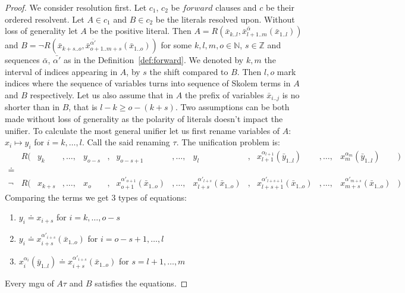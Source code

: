 \documentclass[english, shortabstract]{iithesis}
\theoremstyle{definition} \newtheorem{definition}{Definition}[chapter]
\theoremstyle{remark} \newtheorem{remark}[definition]{Observation}
\theoremstyle{plain} \newtheorem{theorem}[definition]{Theorem}
\theoremstyle{plain} \newtheorem{lemma}[definition]{Lemma}
\begin{document}
\begin{proof}
\par We consider resolution first. Let $c_1$, $c_2$ be $forward$ clauses and $c$ be their ordered resolvent.
Let $A\in c_1$ and $B\in c_2$ be the literals resolved upon.
Without loss of generality let $A$ be the positive literal.
Then $A=R(\bar{x}_{k..l}, \bar{x}^{\bar{\alpha}}_{{l+1..m}}(\bar{x}_{1..l}))$
and $B=\lnot R(\bar{x}_{k+s..o}, \bar{x}^{\bar{\alpha'}}_{{o+1..m+s}}(\bar{x}_{1..o}))$ for some $k,l,m,o\in \mathbb{N}$, $s\in \mathbb{Z}$
and sequences $\bar{\alpha}$, $\bar{\alpha'}$ as in the Definition~\ref{def:forward}. 
We denoted by $k, m$ the interval of indices appearing in $A$, by $s$ the shift compared to $B$.
Then $l, o$ mark indices where the sequence of variables turns into sequence of Skolem terms in $A$ and $B$ respectively.
Let us also assume that in $A$ the prefix of variables $\bar{x}_{i..j}$
is no shorter than in $B$, that is $l-k\geq o-(k+s)$. Two assumptions can be both made without loss of generality as
the polarity of literals doesn't impact the unifier.
To calculate the most general unifier let us first rename variables of $A$: $x_i \mapsto y_i$ for $i=k,\dots, l$.
Call the said renaming $\tau$.
The unification problem is:
\begin{align*}
&R(&y_k&, \dots, &y_{o-s}&,&y_{o-s+1}&,\dots,                                  &y_l&,                                     &x^{\alpha_{l+1}}_{l+1}(\bar{y}_{1..l})&, \dots,      &x^{\alpha_{m}}_{m}(\bar{y}_{1..l})&) \\
    \doteq \\
\lnot &R(&x_{k+s}&, \dots, &x_{o}&,&x^{\alpha'_{o+1}}_{o+1}(\bar{x}_{1..o})&, \dots, &x^{\alpha'_{l+s}}_{l+s}(\bar{x}_{1..o})&, &x^{\alpha'_{l+s+1}}_{l+s+1}(\bar{x}_{1..o})&, \dots, &x^{\alpha'_{m+s}}_{m+s}(\bar{x}_{1..o})&)
\end{align*}
Comparing the terms we get 3 types of equations:
\begin{enumerate}
    \item $y_i\doteq x_{i+s}$ for $i=k,\dots, o-s$
    \item $y_i\doteq x^{\alpha'_{i+s}}_{i+s}(\bar{x}_{1..o})$ for $i=o-s+1,\dots, l$
    \item $x_i^{\alpha_{i}}(\bar{y}_{1..l})\doteq x^{\alpha'_{i+s}}_{i+s}(\bar{x}_{1..o})$ for $s=l+1,\dots, m$
\end{enumerate}
Every mgu of $A\tau$ and $B$ satisfies the equations.


\end{proof}
\end{document}
